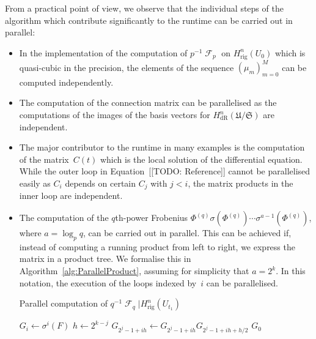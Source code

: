 \documentclass[a4paper,11pt]{article}
\numberwithin{equation}{section}
\DeclareMathOperator{\Frob}{\mathcal{F}} %
\providecommand{\HdR}{H_{\text{dR}}}    %
\providecommand{\Hrig}{H_{\text{rig}}}  %
\theoremstyle{definition}
\begin{document}
From a practical point of view, we observe that the individual steps 
of the algorithm which contribute significantly to the runtime can be 
carried out in parallel:
\begin{itemize}
\item In the implementation of the computation of $p^{-1} \Frob_p$ 
      on $\Hrig^{n}(U_0)$ which is quasi-cubic in the precision, 
      the elements of the sequence $(\mu_m)_{m=0}^{M}$ can be computed 
      independently.
\item The computation of the connection matrix can be parallelised 
      as the computations of the images of the basis vectors for 
      $\HdR^{n}(\mathfrak{U}/\mathfrak{S})$ are independent.
\item The major contributor to the runtime in many examples is the 
      computation of the matrix~$C(t)$ which is the local solution 
      of the differential equation.  While the outer loop in 
      Equation~[[TODO: Reference]] cannot be parallelised easily 
      as $C_{i}$ depends on certain $C_{j}$ with $j < i$, the 
      matrix products in the inner loop are independent.
\item The computation of the $q$th-power Frobenius 
      $\Phi^{(q)} \sigma(\Phi^{(q)}) \dotsm \sigma^{a-1}(\Phi^{(q)})$, 
      where $a = \log_{p} q$, can be carried out in parallel.  This can 
      be achieved if, instead of computing a running product from left to 
      right, we express the matrix in a product tree.  We formalise this in 
      Algorithm~\ref{alg:ParallelProduct}, assuming for simplicity 
      that $a = 2^k$.  In this notation, the execution of the 
      loops indexed by~$i$ can be parallelised.
      \begin{algorithm}
      \caption{Parallel computation of $q^{-1} \Frob_{q} | \Hrig^{n}(U_{t_1})$}
      \label{alg:ParallelProduct}
      \begin{algorithmic}
      \vspace{1mm}
          \State $G_i \gets \sigma^{i}(F)$
      \EndFor
          \State $h \gets 2^{k-j}$
          \State $G_{2^j-1 + ih} \gets G_{2^j-1 + i h} G_{2^j-1 + ih + h/2}$
          \EndFor
      \EndFor
      \Return $G_0$
      \end{algorithmic}
      \end{algorithm}
\end{itemize}




\end{document}
